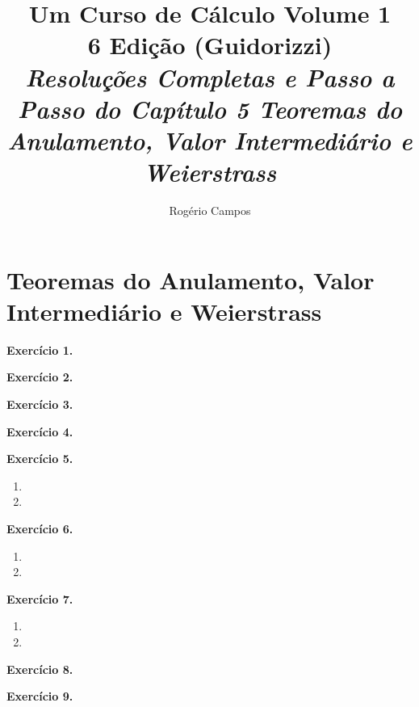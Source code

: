 \documentclass[12pt,a4paper]{article}
\title{
    \Huge \textbf{Um Curso de Cálculo Volume 1} \\
    \vspace{0.3cm}
    \Large 6\textordfeminine{} Edição (Guidorizzi) \\
    \vspace{0.5cm}
    \large \textit{Resoluções Completas e Passo a Passo do Capítulo 5 Teoremas do Anulamento, Valor Intermediário e Weierstrass}
}
\author{Rogério Campos}
\begin{document}
\maketitle
\newpage

\tableofcontents
\newpage

\setcounter{section}{4}
\setcounter{subsection}{0}

\section{Teoremas do Anulamento, Valor Intermediário e Weierstrass}

\vspace{0.5cm}
\noindent\textbf{Exercício 1.}

\vspace{0.5cm}
\noindent\textbf{Exercício 2.}

\vspace{0.5cm}
\noindent\textbf{Exercício 3.}

\vspace{0.5cm}
\noindent\textbf{Exercício 4.}

\vspace{0.5cm}
\noindent\textbf{Exercício 5.}
\begin{enumerate}
    \renewcommand{\theenumi}{\alph{enumi}}
    \renewcommand{\labelenumi}{\theenumi)}
    \item 
    \item 
\end{enumerate}

\vspace{0.5cm}
\noindent\textbf{Exercício 6.}
\begin{enumerate}
    \renewcommand{\theenumi}{\alph{enumi}}
    \renewcommand{\labelenumi}{\theenumi)}
    \item 
    \item 
\end{enumerate}

\vspace{0.5cm}
\noindent\textbf{Exercício 7.}
\begin{enumerate}
    \renewcommand{\theenumi}{\alph{enumi}}
    \renewcommand{\labelenumi}{\theenumi)}
    \item 
    \item 
\end{enumerate}

\vspace{0.5cm}
\noindent\textbf{Exercício 8.}

\vspace{0.5cm}
\noindent\textbf{Exercício 9.}
\end{document}
